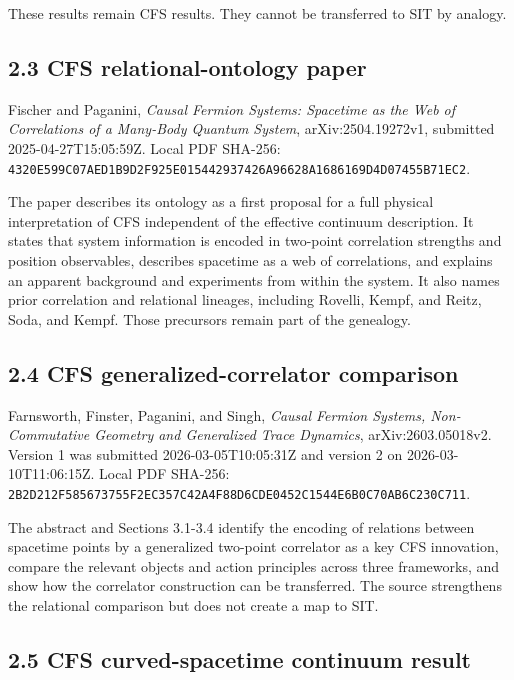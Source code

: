 \documentclass[
  american,
  11pt,
  letterpaper,
]{article}
\begin{document}
These results remain CFS results. They cannot be transferred to SIT by analogy.

\subsection{2.3 CFS relational-ontology paper}\label{cfs-relational-ontology-paper}

Fischer and Paganini, \emph{Causal Fermion Systems: Spacetime as the Web of Correlations of a Many-Body Quantum System}, arXiv:2504.19272v1, submitted 2025-04-27T15:05:59Z. Local PDF SHA-256: \nolinkurl{4320E599C07AED1B9D2F925E015442937426A96628A1686169D4D07455B71EC2}.

The paper describes its ontology as a first proposal for a full physical interpretation of CFS independent of the effective continuum description. It states that system information is encoded in two-point correlation strengths and position observables, describes spacetime as a web of correlations, and explains an apparent background and experiments from within the system. It also names prior correlation and relational lineages, including Rovelli, Kempf, and Reitz, Soda, and Kempf. Those precursors remain part of the genealogy.

\subsection{2.4 CFS generalized-correlator comparison}\label{cfs-generalized-correlator-comparison}

Farnsworth, Finster, Paganini, and Singh, \emph{Causal Fermion Systems, Non-Commutative Geometry and Generalized Trace Dynamics}, arXiv:2603.05018v2. Version 1 was submitted 2026-03-05T10:05:31Z and version 2 on 2026-03-10T11:06:15Z. Local PDF SHA-256: \nolinkurl{2B2D212F585673755F2EC357C42A4F88D6CDE0452C1544E6B0C70AB6C230C711}.

The abstract and Sections 3.1-3.4 identify the encoding of relations between spacetime points by a generalized two-point correlator as a key CFS innovation, compare the relevant objects and action principles across three frameworks, and show how the correlator construction can be transferred. The source strengthens the relational comparison but does not create a map to SIT.

\subsection{2.5 CFS curved-spacetime continuum result}\label{cfs-curved-spacetime-continuum-result}
\end{document}
